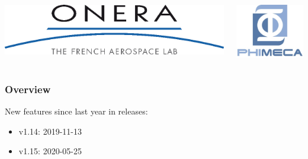 \documentclass{beamer}
\begin{document}
\begin{frame}
\begin{columns}
  \begin{center}
\includegraphics[height=0.05\textheight]{figures/onera-logo.png}
\end{center}

  \begin{center}
\includegraphics[height=0.08\textheight]{figures/logo-phimeca.png}
\end{center}


  \end{columns}

  \end{frame}

\begin{frame}
\frametitle{Overview}

New features since last year in releases:

\begin{itemize}
\item v1.14: 2019-11-13
\item v1.15: 2020-05-25
\end{itemize}



\end{frame}
  
\end{document}
